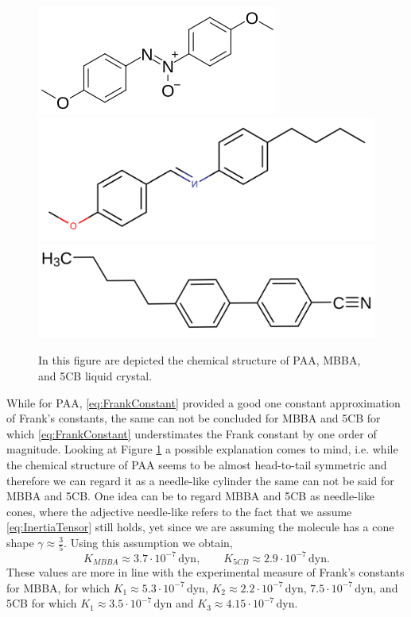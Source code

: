 \documentclass[%
 aip,
 amsmath,amssymb,
 reprint,%
]{revtex4-1}
\begin{document}
\begin{figure}
  \includegraphics[scale=0.4]{Figures/PAA}\\
  \includegraphics[scale=0.11]{Figures/MBBA}
  \includegraphics[scale=0.085]{Figures/5CB}
  \caption{In this figure are depicted the chemical structure of PAA, MBBA, and 5CB liquid crystal.}
  \label{fig:chem}
\end{figure}

While for PAA, \eqref{eq:FrankConstant} provided a good one constant approximation of Frank's constants, the same can not be concluded for MBBA and 5CB for which \eqref{eq:FrankConstant} understimates the Frank constant by one order of magnitude.
Looking at Figure \ref{fig:chem} a possible explanation comes to mind, i.e. while the chemical structure of PAA seems to be almost head-to-tail symmetric and therefore we can regard it as a needle-like cylinder the same can not be said for MBBA and 5CB.
One idea can be to regard MBBA and 5CB as needle-like cones, where the adjective needle-like refers to the fact that we assume \eqref{eq:InertiaTensor} still holds, yet since we are assuming the molecule has a cone shape $\gamma\approx\frac{3}{5}$.
Using this assumption we obtain,
\begin{equation}
  K_{MBBA} \approx 3.7 \cdot 10^{-7}\,\text{dyn}, \qquad K_{5CB}\approx 2.9\cdot 10^{-7}\,\text{dyn}.
\end{equation}
These values are more in line with the experimental measure of Frank's constants for MBBA, for which $K_1 \approx 5.3 \cdot 10^{-7}\,\text{dyn}$, $K_2 \approx 2.2 \cdot 10^{-7}\,\text{dyn}$, $7.5\cdot 10^{-7}\, \text{dyn}$\cite{dGJ}, and 5CB for which $K_1\approx 3.5\cdot 10^{-7}\,\text{dyn}$ and $K_3\approx 4.15\cdot 10^{-7}\,\text{dyn}$\cite{BRBF85}.
\end{document}
